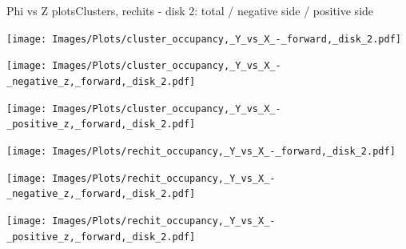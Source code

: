 \documentclass{beamer}
\begin{document}
\begin{frame}{Phi vs Z plots}{Clusters, rechits - disk 2: total / negative side / positive side}
  \hspace{0.01\textwidth}%
  \begin{minipage}{0.32\textwidth}
    \centering
    \texttt{[image: Images/Plots/cluster\_occupancy,\_Y\_vs\_X\_-\_forward,\_disk\_2.pdf]}
  \end{minipage}%
  \hspace{0.01\textwidth}%
  \begin{minipage}{0.32\textwidth}
    \centering
    \texttt{[image: Images/Plots/cluster\_occupancy,\_Y\_vs\_X\_-\_negative\_z,\_forward,\_disk\_2.pdf]}
  \end{minipage}
  \vspace*{0.2cm}
  \begin{minipage}{0.32\textwidth}
    \centering
    \texttt{[image: Images/Plots/cluster\_occupancy,\_Y\_vs\_X\_-\_positive\_z,\_forward,\_disk\_2.pdf]}
  \end{minipage}
  \hspace{0.01\textwidth}%
  \begin{minipage}{0.32\textwidth}
    \centering
    \texttt{[image: Images/Plots/rechit\_occupancy,\_Y\_vs\_X\_-\_forward,\_disk\_2.pdf]}
  \end{minipage}%
  \hspace{0.01\textwidth}%
  \begin{minipage}{0.32\textwidth}
    \centering
    \texttt{[image: Images/Plots/rechit\_occupancy,\_Y\_vs\_X\_-\_negative\_z,\_forward,\_disk\_2.pdf]}
  \end{minipage}
  \vspace*{0.2cm}
  \begin{minipage}{0.32\textwidth}
    \centering
    \texttt{[image: Images/Plots/rechit\_occupancy,\_Y\_vs\_X\_-\_positive\_z,\_forward,\_disk\_2.pdf]}
  \end{minipage}
\end{frame}
\end{document}
